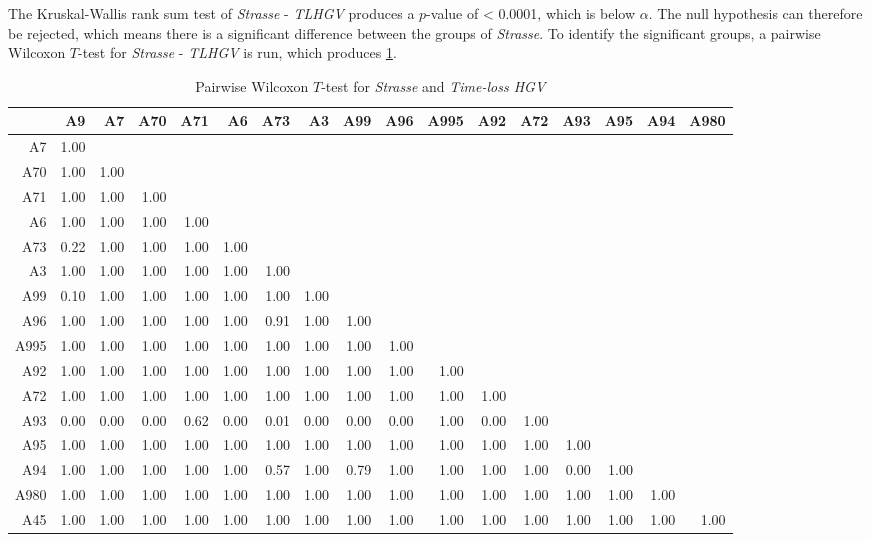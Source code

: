 The Kruskal-Wallis rank sum test of \textit{Strasse} - \textit{TLHGV} produces a $p$-value of < 0.0001, which is below $\alpha$. The null hypothesis can therefore be rejected, which means there is a significant difference between the groups of \textit{Strasse}. To identify the significant groups, a pairwise Wilcoxon $T$-test for \textit{Strasse} - \textit{TLHGV} is run, which produces \cref{tbl:wilcoxon_arbis_matched_Strasse_TLHGV}. 
\begin{table}[ht!]
	\tiny
	\setlength{\tabcolsep}{4pt}
	\centering
	\begin{tabular}{rrrrrrrrrrrrrrrrr}
		\hline
			& A9 & A7 & A70 & A71 & A6 & A73 & A3 & A99 & A96 & A995 & A92 & A72 & A93 & A95 & A94 & A980 \\ 
		\hline
		A7   & 1.00 &  &  &  &  &  &  &  &  &  &  &  &  &  &  &  \\ 
		A70  & 1.00 & 1.00 &  &  &  &  &  &  &  &  &  &  &  &  &  &  \\ 
		A71  & 1.00 & 1.00 & 1.00 &  &  &  &  &  &  &  &  &  &  &  &  &  \\ 
		A6   & 1.00 & 1.00 & 1.00 & 1.00 &  &  &  &  &  &  &  &  &  &  &  &  \\ 
		A73  & 0.22 & 1.00 & 1.00 & 1.00 & 1.00 &  &  &  &  &  &  &  &  &  &  &  \\ 
		A3   & 1.00 & 1.00 & 1.00 & 1.00 & 1.00 & 1.00 &  &  &  &  &  &  &  &  &  &  \\ 
		A99  & 0.10 & 1.00 & 1.00 & 1.00 & 1.00 & 1.00 & 1.00 &  &  &  &  &  &  &  &  &  \\ 
		A96  & 1.00 & 1.00 & 1.00 & 1.00 & 1.00 & 0.91 & 1.00 & 1.00 &  &  &  &  &  &  &  &  \\ 
		A995 & 1.00 & 1.00 & 1.00 & 1.00 & 1.00 & 1.00 & 1.00 & 1.00 & 1.00 &  &  &  &  &  &  &  \\ 
		A92  & 1.00 & 1.00 & 1.00 & 1.00 & 1.00 & 1.00 & 1.00 & 1.00 & 1.00 & 1.00 &  &  &  &  &  &  \\ 
		A72  & 1.00 & 1.00 & 1.00 & 1.00 & 1.00 & 1.00 & 1.00 & 1.00 & 1.00 & 1.00 & 1.00 &  &  &  &  &  \\ 
		A93  & 0.00 & 0.00 & 0.00 & 0.62 & 0.00 & 0.01 & 0.00 & 0.00 & 0.00 & 1.00 & 0.00 & 1.00 &  &  &  &  \\ 
		A95  & 1.00 & 1.00 & 1.00 & 1.00 & 1.00 & 1.00 & 1.00 & 1.00 & 1.00 & 1.00 & 1.00 & 1.00 & 1.00 &  &  &  \\ 
		A94  & 1.00 & 1.00 & 1.00 & 1.00 & 1.00 & 0.57 & 1.00 & 0.79 & 1.00 & 1.00 & 1.00 & 1.00 & 0.00 & 1.00 &  &  \\ 
		A980 & 1.00 & 1.00 & 1.00 & 1.00 & 1.00 & 1.00 & 1.00 & 1.00 & 1.00 & 1.00 & 1.00 & 1.00 & 1.00 & 1.00 & 1.00 &  \\ 
		A45  & 1.00 & 1.00 & 1.00 & 1.00 & 1.00 & 1.00 & 1.00 & 1.00 & 1.00 & 1.00 & 1.00 & 1.00 & 1.00 & 1.00 & 1.00 & 1.00 \\ 
		\bottomrule
	\end{tabular}
	\caption{Pairwise Wilcoxon $T$-test for \textit{Strasse} and \textit{Time-loss HGV}}
	\label{tbl:wilcoxon_arbis_matched_Strasse_TLHGV}
\end{table}
